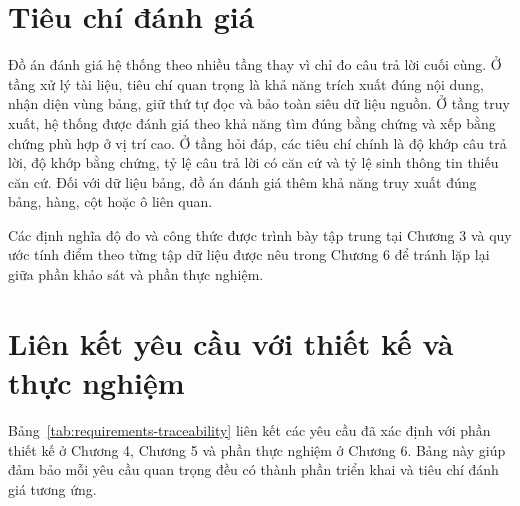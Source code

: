 \documentclass[../DoAn.tex]{subfiles}
\begin{document}
\section{Tiêu chí đánh giá}
\label{section:evaluation-criteria-chapter2}

Đồ án đánh giá hệ thống theo nhiều tầng thay vì chỉ đo câu trả lời cuối cùng. Ở
tầng xử lý tài liệu, tiêu chí quan trọng là khả năng trích xuất đúng nội dung, nhận
diện vùng bảng, giữ thứ tự đọc và bảo toàn siêu dữ liệu nguồn. Ở tầng truy xuất, hệ
thống được đánh giá theo khả năng tìm đúng bằng chứng và xếp bằng chứng phù
hợp ở vị trí cao. Ở tầng hỏi đáp, các tiêu chí chính là độ khớp câu trả lời, độ khớp
bằng chứng, tỷ lệ câu trả lời có căn cứ và tỷ lệ sinh thông tin thiếu căn cứ. Đối với
dữ liệu bảng, đồ án đánh giá thêm khả năng truy xuất đúng bảng, hàng, cột hoặc ô
liên quan.

Các định nghĩa độ đo và công thức được trình bày tập trung tại Chương 3 và quy
ước tính điểm theo từng tập dữ liệu được nêu trong Chương 6 để tránh lặp lại giữa
phần khảo sát và phần thực nghiệm.

\section{Liên kết yêu cầu với thiết kế và thực nghiệm}
\label{section:requirements-traceability}

Bảng~\ref{tab:requirements-traceability} liên kết các yêu cầu đã xác định với phần
thiết kế ở Chương 4, Chương 5 và phần thực nghiệm ở Chương 6. Bảng này giúp đảm bảo mỗi
yêu cầu quan trọng đều có thành phần triển khai và tiêu chí đánh giá tương ứng.
\end{document}
